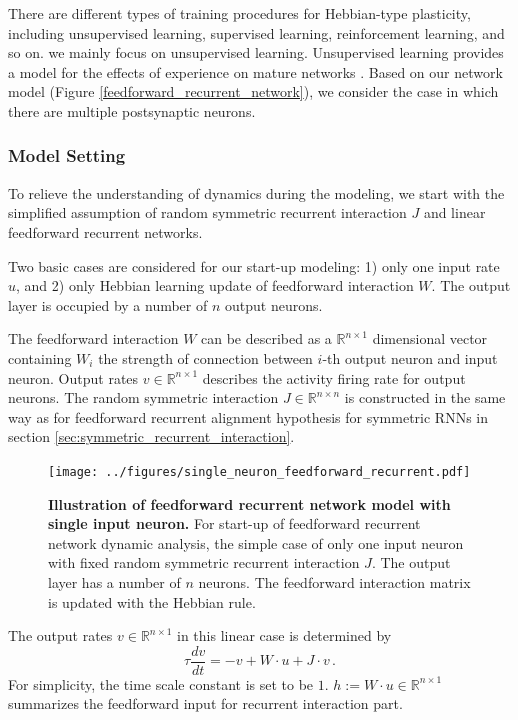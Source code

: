\documentclass[11pt]{article}
\begin{document}
{	There are different types of training procedures for Hebbian-type plasticity, including unsupervised learning, supervised learning, reinforcement learning, and so on. we mainly focus on unsupervised learning. Unsupervised learning provides a model for the effects of experience on mature networks \cite{dayan2005theoretical}. Based on our network model (Figure \ref{feedforward_recurrent_network}), we consider the case in which there are multiple postsynaptic neurons. 
	
	\subsubsection{Model Setting}
	To relieve the understanding of dynamics during the modeling, we start with the simplified assumption of random symmetric recurrent interaction $J$ and linear feedforward recurrent networks.
	
	Two basic cases are considered for our start-up modeling: 1) only one input rate $u$, and 2) only Hebbian learning update of feedforward interaction $W$. The output layer is occupied by a number of $n$ output neurons. 
	
	The feedforward interaction $W$ can be described as a $\mathbb{R}^{n \times 1}$ dimensional vector containing $W_i$ the strength of connection between $i$-th output neuron and input neuron. Output rates $v \in \mathbb{R}^{n \times 1}$ describes the activity firing rate for output neurons. The random symmetric interaction $J \in \mathbb{R}^{n \times n}$ is constructed in the same way as for feedforward recurrent alignment hypothesis for symmetric RNNs in section \ref{sec:symmetric_recurrent_interaction}. 
	
		\begin{figure}[H]
			\centering
			\texttt{[image: ../figures/single\_neuron\_feedforward\_recurrent.pdf]}
			\caption{\textbf{Illustration of feedforward recurrent network model with single input neuron.} For start-up of feedforward recurrent network dynamic analysis, the simple case of only one input neuron with fixed random symmetric recurrent interaction $J$. The output layer has a number of $n$ neurons. The feedforward interaction matrix is updated with the Hebbian rule.}
			\label{fig:single_neuron_feedforward_recurrent_network}
		\end{figure}
	
	The output rates $v \in \mathbb{R}^{n \times 1}$ in this linear case is determined by 
		\begin{equation} \label{eq:response_ffrec_network}
			\tau \frac{dv}{dt} = -v + W \cdot u + J \cdot v \,.
		\end{equation}
	For simplicity, the time scale constant is set to be $1$. $h := W \cdot u \in \mathbb{R}^{n \times 1}$ summarizes the feedforward input for recurrent interaction part. 
	
}
\end{document}
